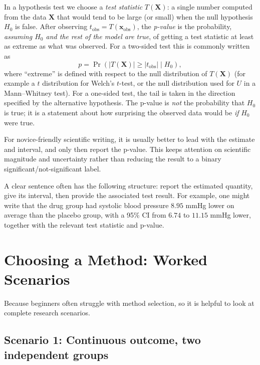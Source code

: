 \documentclass[11pt]{article}
\begin{document}
In a hypothesis test we choose a \emph{test statistic} \(T(\mathbf{X})\): a single number computed from the data \(\mathbf{X}\) that would tend to be large (or small) when the null hypothesis \(H_0\) is false. After observing \(t_{\text{obs}} = T(\mathbf{x}_{\text{obs}})\), the \emph{p-value} is the probability, \emph{assuming \(H_0\) and the rest of the model are true}, of getting a test statistic at least as extreme as what was observed. For a two-sided test this is commonly written as
\[
 p = \Pr\!\left(|T(\mathbf{X})| \ge |t_{\text{obs}}| \mid H_0\right),
\]
where ``extreme'' is defined with respect to the null distribution of \(T(\mathbf{X})\) (for example a \(t\) distribution for Welch's \(t\)-test, or the null distribution used for \(U\) in a Mann--Whitney test). For a one-sided test, the tail is taken in the direction specified by the alternative hypothesis. The p-value is \emph{not} the probability that \(H_0\) is true; it is a statement about how surprising the observed data would be \emph{if} \(H_0\) were true.

For novice-friendly scientific writing, it is usually better to lead with the estimate and interval, and only then report the p-value. This keeps attention on scientific magnitude and uncertainty rather than reducing the result to a binary significant/not-significant label.

A clear sentence often has the following structure: report the estimated quantity, give its interval, then provide the associated test result. For example, one might write that the drug group had systolic blood pressure $8.95$ mmHg lower on average than the placebo group, with a 95\% CI from $6.74$ to $11.15$ mmHg lower, together with the relevant test statistic and p-value.



\section{Choosing a Method: Worked Scenarios}

Because beginners often struggle with method selection, so it is helpful to look at complete research scenarios.

\subsection{Scenario 1: Continuous outcome, two independent groups}
\end{document}
